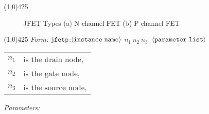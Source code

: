 \documentclass{article}
\begin{document}
\hrulefill\linethickness{0.5mm}\line(1,0){425}
\normalsize
\newline
\begin{figure}[h]
\centerline{\epsfxsize=4in} \caption{JFET Types (a)
N-channel FET (b) P-channel FET}
\end{figure}
\newline
\linethickness{0.5mm} \line(1,0){425}
\newline
\textit{Form:}
$\tt jfetp$:$\langle \tt{instance\ name}\rangle$ $n_1\ n_2\ n_3\ $
$\langle \tt{parameter\ list}\rangle$
\newline
\begin{tabular}{r l}
$n_1$ & is the drain node, \\
$n_2$ & is the gate node, \\
$n_3$ & is the source node, \\
\end{tabular}
\newline
\textit{Parameters:}
\end{document}
